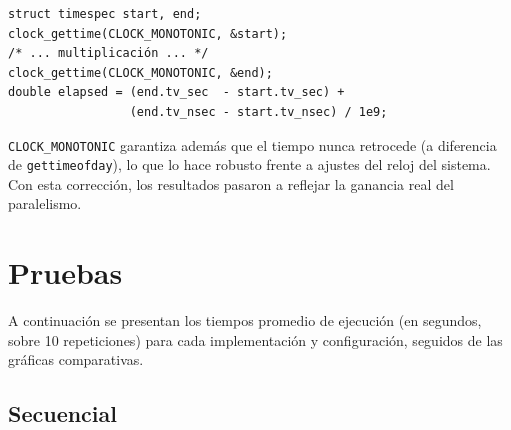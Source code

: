 \documentclass{article}
\begin{document}
\begin{verbatim}
struct timespec start, end;
clock_gettime(CLOCK_MONOTONIC, &start);
/* ... multiplicación ... */
clock_gettime(CLOCK_MONOTONIC, &end);
double elapsed = (end.tv_sec  - start.tv_sec) +
                 (end.tv_nsec - start.tv_nsec) / 1e9;
\end{verbatim}

\texttt{CLOCK\_MONOTONIC} garantiza además que el tiempo nunca retrocede (a diferencia de \texttt{gettimeofday}), lo que lo hace robusto frente a ajustes del reloj del sistema. Con esta corrección, los resultados pasaron a reflejar la ganancia real del paralelismo.

\section{Pruebas}

A continuación se presentan los tiempos promedio de ejecución (en segundos, sobre 10 repeticiones) para cada implementación y configuración, seguidos de las gráficas comparativas.

\subsection{Secuencial}
\end{document}
